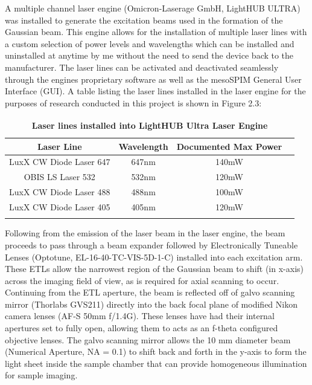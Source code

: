 A multiple channel laser engine (Omicron-Laserage GmbH, LightHUB ULTRA) was installed to generate the excitation beams used in the formation of the Gaussian beam. This engine allows for the installation of multiple laser lines with a custom selection of power levels and wavelengths which can be installed and uninstalled at anytime by me without the need to send the device back to the manufacturer. The laser lines can be  activated and deactivated seamlessly through the engines proprietary software as well as the mesoSPIM General User Interface (GUI). A table listing the laser lines installed in the laser engine for the purposes of research conducted in this project is shown in Figure 2.3: 


\begin{table} [ht]
    \centering
    
    \begin{tabular}{cccc}
            \medskip
            \textbf{Laser Line} & \textbf{Wavelength} & \textbf{Documented Max Power}\\ \hline
             \medskip
            LuxX CW Diode Laser 647& 647nm & 140mW\\
             \medskip
            OBIS LS Laser 532 & 532nm & 120mW\\
             \medskip
            LuxX CW Diode Laser 488 & 488nm & 100mW\\
             \medskip
            LuxX CW Diode Laser 405&  405nm & 120mW\\ \hline
             \medskip
    \end{tabular}
    \caption{\textbf{Laser lines installed into LightHUB Ultra\textsuperscript{\textregistered} Laser Engine}}
    \label{tab:my_label}
\end{table}

Following from the emission of the laser beam in the laser engine, the beam proceeds to pass through a beam expander followed by Electronically Tuneable Lenses (Optotune, EL-16-40-TC-VIS-5D-1-C) installed into each excitation arm. These ETLs allow the narrowest region of the Gaussian beam to shift (in x-axis) across the imaging field of view, as is required for axial scanning to occur. Continuing from the ETL aperture, the beam is reflected off of galvo scanning mirror (Thorlabs GVS211) directly into the back focal plane of modified Nikon camera lenses (AF-S 50mm f/1.4G). These lenses have had their internal apertures set to fully open, allowing them to acts as an f-theta configured objective lenses. The galvo scanning mirror allows the 10 mm diameter beam (Numerical Aperture, NA = 0.1) to shift back and forth in the y-axis to form the light sheet inside the sample chamber that can provide homogeneous illumination for sample imaging.


